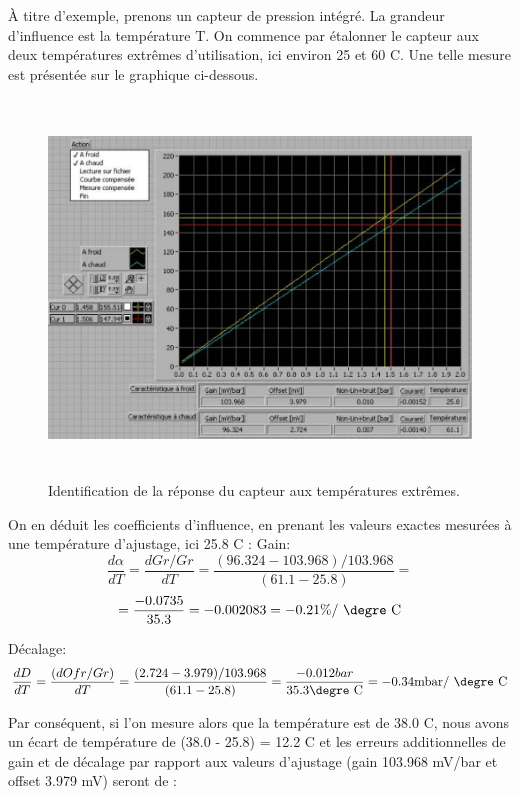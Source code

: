 \documentclass[main.tex]{subfiles}
\begin{document}
À titre d'exemple, prenons un capteur de pression intégré. La grandeur d'influence est la température T. On commence par étalonner le capteur aux deux températures extrêmes d'utilisation, ici environ 25 et 60 \degre C. Une telle mesure est présentée sur le graphique ci-dessous.

\begin{figure}
    \centering
    \includegraphics[height=10cm]{assets/figures/3_5_identification_reponse_en_temperature.PNG}
    \caption{ Identification de la réponse du capteur aux températures extrêmes.}
    \label{fig:IdentificationTemperature}
\end{figure}

On en déduit les coefficients d'influence, en prenant les valeurs exactes mesurées à une température d'ajustage, ici 25.8 \degre C :
Gain:
\[
    \frac{d\alpha}{dT} = \frac{dGr/Gr}{dT} = \frac{(96.324-103.968)/103.968}{ (61.1-25.8)} =\]
\begin{equation}
    = \frac{-0.0735}{35.3} = -0.002083 = -0.21 \% \text{/ \degre C}
\end{equation}

Décalage:
\begin{equation}
    \frac{dD}{dT} = \frac{(dOfr/Gr)}{dT} = \frac{(2.724-3.979)/103.968}{(61.1-25.8)} =
    \frac{-0.012 bar}{ 35.3 \text{\degre C}} = -0.34 \text{mbar/ \degre C}
\end{equation}

Par conséquent, si l'on mesure alors que la température est de 38.0 \degre C, nous avons un écart de température de (38.0 - 25.8) = 12.2 \degre C et les erreurs additionnelles de gain et de décalage par rapport aux valeurs d'ajustage (gain 103.968 mV/bar et offset 3.979 mV) seront de :
\end{document}
